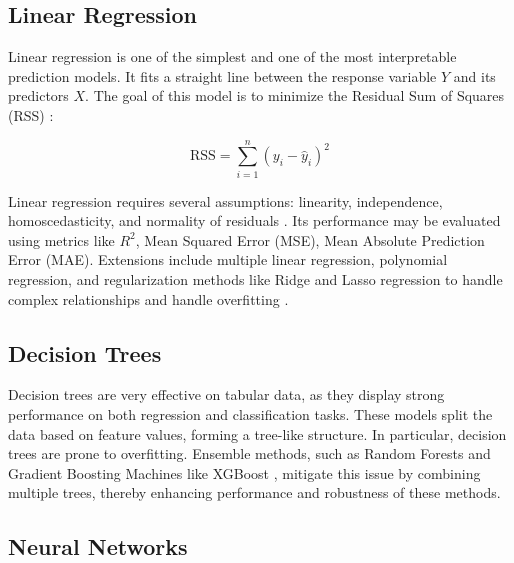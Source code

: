 \documentclass[conference]{IEEEtran}
\begin{document}
\subsection{Linear Regression}

Linear regression is one of the simplest and one of the most interpretable prediction models. It fits a straight line between the response variable $Y$ and its predictors $X$. The goal of this model is to minimize the Residual Sum of Squares (RSS) \cite{Seber}:

\[
\text{RSS} = \sum_{i=1}^n (y_i - \hat{y}_i)^2
\]

Linear regression requires several assumptions: linearity, independence, homoscedasticity, and normality of residuals \cite{Kutner}. Its performance may be  evaluated using metrics like $R^2$, Mean Squared Error (MSE), Mean Absolute Prediction Error (MAE). Extensions include multiple linear regression, polynomial regression, and regularization methods like Ridge and Lasso regression to handle complex relationships and handle overfitting \cite{Wright, Weisberg}.

\subsection{Decision Trees}

Decision trees are very effective on tabular data, as they display strong performance on both regression and classification tasks. These models split the data based on feature values, forming a tree-like structure. In particular, decision trees are prone to overfitting. Ensemble methods, such as Random Forests \cite{Breiman} and Gradient Boosting Machines like XGBoost \cite{Chen}, mitigate this issue by combining multiple trees, thereby enhancing performance and robustness of these methods.

\subsection{Neural Networks}
\end{document}
